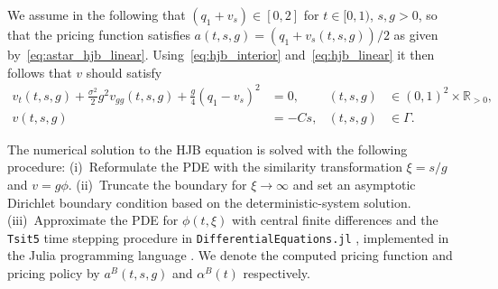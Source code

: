 \documentclass[main.tex]{subfiles}
\begin{document}
We assume in the following that $(q_1+v_s)\in[0,2]$ for
$t\in[0,1)$, $s,g>0$, so
that the pricing function satisfies $a(t,s,g) = (q_1+v_s(t,s,g))/2$ as
given by~\eqref{eq:astar_hjb_linear}.
Using~\eqref{eq:hjb_interior} and~\eqref{eq:hjb_linear} it then
follows that $v$ should satisfy
\begin{align}\label{eq:hjb_impact_uncertainty}
  v_t(t,s,g)+\frac{\sigma^2}{2} g^2v_{gg}(t,s,g)
  +\frac{g}{4}{(q_1-v_s)}^2
  &= 0,&(t,s,g)&\in{(0,1)}^2\times \mathbb R_{>0},\\
  v(t,s,g) &= -Cs,&(t,s,g)&\in \Gamma.
\end{align}

The numerical solution to the HJB equation is solved with the
following procedure: (i)~Reformulate the PDE with the similarity
transformation $\xi = s/g$ and $v = g\phi$. (ii)~Truncate the boundary
for $\xi\to\infty$ and set an asymptotic Dirichlet boundary condition
based on the deterministic-system solution. (iii)~Approximate
the PDE for $\phi(t,\xi)$ with central finite differences and the
\texttt{Tsit5} time stepping procedure in
\texttt{DifferentialEquations.jl}
\citep{rackauckas2017differentialequations}, implemented in the Julia
programming language \citep{bezanson2017julia}.
We denote the computed pricing function and pricing
policy by $a^B(t,s,g)$ and $\alpha^B(t)$ respectively.
\end{document}
